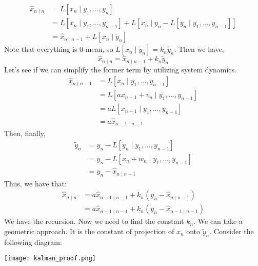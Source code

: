 \begin{theorem}
    \begin{proof*}
        \begin{align*}
            \hat{x}_{n \mid n} &= L[x_n \mid y_1, \dots, y_n] \\
            &= L[x_n \mid y_1, \dots, y_{n - 1}] + L[x_n \mid y_n - L[y_n \mid y_1, \dots, y_{n - 1}]] \\
            &= \hat{x}_{n \mid n - 1} + L[x_n \mid \tilde{y}_n]
        \end{align*}
        Note that everything is 0-mean, so $L[x_n \mid \tilde{y}_n] = k_n \tilde{y}_n$. Then we have,
        \[ \hat{x}_{n \mid n} = \hat{x}_{n \mid n - 1} + k_n \tilde{y}_n \]
        Let's see if we can simplify the former term by utilizing system dynamics.
        \begin{align*}
            \hat{x}_{n \mid n - 1} &= L[x_n \mid y_1, \dots, y_{n - 1}] \\
            &= L[a x_{n - 1} + v_n \mid y_1, \dots, y_{n - 1}] \\
            &= a L[x_{n - 1} \mid y_1, \dots, y_{n - 1}] \\
            &= a \hat{x}_{n - 1 \mid n - 1}
        \end{align*}
        Then, finally,
        \begin{align*}
            \tilde{y}_n &= y_n - L[y_n \mid y_1, \dots, y_{n - 1}] \\
            &= y_n - L[x_n + w_n \mid y_1, \dots, y_{n - 1}] \\
            &= y_n - \hat{x}_{n \mid n - 1}
        \end{align*}
        Thus, we have that:
        \begin{align*}
            \hat{x}_{n \mid n} &= a \hat{x}_{n - 1 \mid n - 1} + k_n(y_n - \hat{x}_{n \mid n - 1}) \\
            &= a \hat{x}_{n - 1 \mid n - 1} + k_n(y_n - \hat{x}_{n - 1 \mid n - 1})
        \end{align*}
        We have the recursion. Now we need to find the constant $k_n$. We can take a geometric approach.
        It is the constant of projection of $x_n$ onto $\tilde{y}_n$. Consider the following diagram:

        \texttt{[image: kalman\_proof.png]}


\end{proof*}
\end{theorem}

